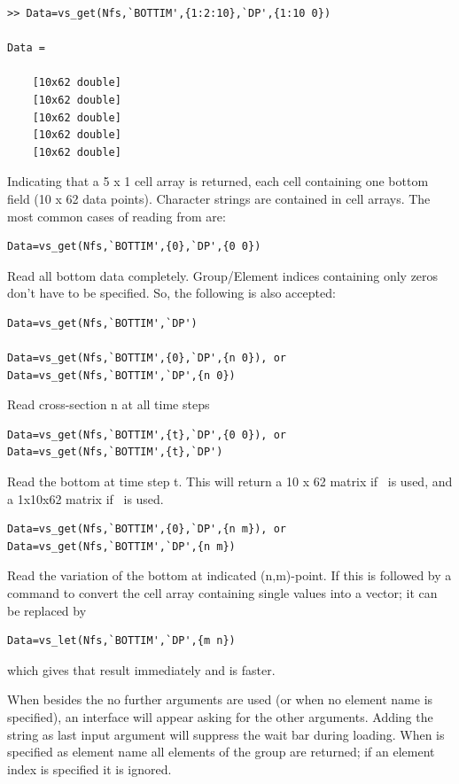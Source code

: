 \begin{Verbatim}
>> Data=vs_get(Nfs,`BOTTIM',{1:2:10},`DP',{1:10 0})

Data =

    [10x62 double]
    [10x62 double]
    [10x62 double]
    [10x62 double]
    [10x62 double]
\end{Verbatim}

Indicating that a 5 x 1 cell array is returned, each cell containing one bottom field (10 x 62 data points).
Character strings are contained in cell arrays.
The most common cases of reading from are:

\begin{Verbatim}
Data=vs_get(Nfs,`BOTTIM',{0},`DP',{0 0})
\end{Verbatim}

Read all bottom data completely.
Group/Element indices containing only zeros don't have to be specified.
So, the following is also accepted:

\begin{Verbatim}
Data=vs_get(Nfs,`BOTTIM',`DP')

Data=vs_get(Nfs,`BOTTIM',{0},`DP',{n 0}), or
Data=vs_get(Nfs,`BOTTIM',`DP',{n 0})
\end{Verbatim}

Read cross-section n at all time steps

\begin{Verbatim}
Data=vs_get(Nfs,`BOTTIM',{t},`DP',{0 0}), or
Data=vs_get(Nfs,`BOTTIM',{t},`DP')
\end{Verbatim}

Read the bottom at time step t.
This will return a 10 x 62 matrix if \vsget~is used, and a 1x10x62 matrix if \vslet~is used.

\begin{Verbatim}
Data=vs_get(Nfs,`BOTTIM',{0},`DP',{n m}), or
Data=vs_get(Nfs,`BOTTIM',`DP',{n m})
\end{Verbatim}

Read the variation of the bottom at indicated (n,m)-point.
If this is followed by a  command to convert the cell array containing single values into a vector; it can be replaced by

\begin{Verbatim}
Data=vs_let(Nfs,`BOTTIM',`DP',{m n})
\end{Verbatim}

which gives that result immediately and is faster.

When besides the  no further arguments are used (or when no element name is specified), an interface will appear asking for the other arguments.
Adding the string  as last input argument will suppress the wait bar during loading.
When  is specified as element name all elements of the group are returned; if an element index is specified it is ignored.

